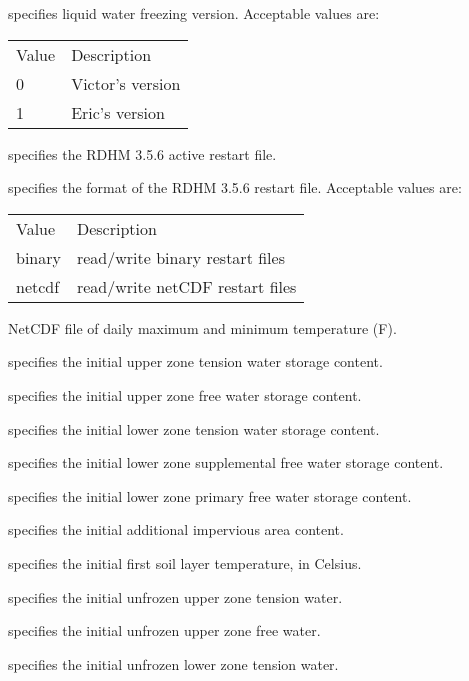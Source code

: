   specifies liquid water freezing
 version.
 Acceptable values are:

 \begin{tabular}{ll}
 Value & Description      \\
 0     & Victor's version \\
 1     & Eric's version   \\
 \end{tabular}

  specifies the RDHM 3.5.6 active
 restart file.

  specifies the format of
 the RDHM 3.5.6 restart file.
 Acceptable values are:

 \begin{tabular}{ll}
 Value  & Description                     \\
 binary & read/write binary restart files \\
 netcdf & read/write netCDF restart files \\
 \end{tabular}

  NetCDF file of daily maximum and
 minimum temperature (F).

  specifies the initial
 upper zone tension water storage content.

  specifies the initial
 upper zone free water storage content.

  specifies the initial
 lower zone tension water storage content.

  specifies the initial
 lower zone supplemental free water storage content.

  specifies the initial
 lower zone primary free water storage content.

  specifies the initial
 additional impervious area content.

  specifies the initial first soil
 layer temperature, in Celsius.

  specifies the initial
 unfrozen upper zone tension water.

  specifies the initial
 unfrozen upper zone free water.

  specifies the initial
 unfrozen lower zone tension water.

